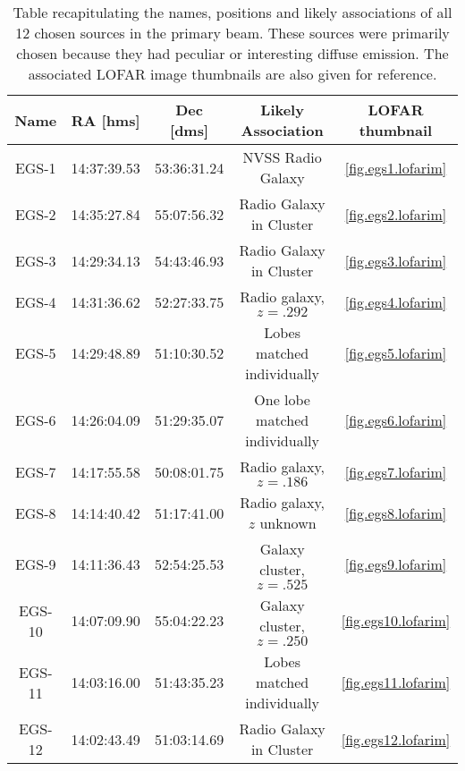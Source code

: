 \begin{table}[h!]
\begin{tabular}{ccccc}
Name    & RA [hms]    & Dec [dms]   & Likely Association            & LOFAR thumbnail \\\hline
EGS-1   & 14:37:39.53 & 53:36:31.24 & NVSS Radio Galaxy             & \cref{fig.egs1.lofarim} \\
EGS-2   & 14:35:27.84 & 55:07:56.32 & Radio Galaxy in Cluster       & \cref{fig.egs2.lofarim} \\ 
EGS-3   & 14:29:34.13 & 54:43:46.93 & Radio Galaxy in Cluster       & \cref{fig.egs3.lofarim} \\
EGS-4   & 14:31:36.62 & 52:27:33.75 & Radio galaxy, $z=.292$        & \cref{fig.egs4.lofarim} \\
EGS-5   & 14:29:48.89 & 51:10:30.52 & Lobes matched individually    & \cref{fig.egs5.lofarim} \\
EGS-6   & 14:26:04.09 & 51:29:35.07 & One lobe matched individually & \cref{fig.egs6.lofarim} \\
EGS-7   & 14:17:55.58 & 50:08:01.75 & Radio galaxy, $z=.186$        & \cref{fig.egs7.lofarim} \\
EGS-8   & 14:14:40.42 & 51:17:41.00 & Radio galaxy, $z$ unknown     & \cref{fig.egs8.lofarim} \\
EGS-9   & 14:11:36.43 & 52:54:25.53 & Galaxy cluster, $z=.525$      & \cref{fig.egs9.lofarim} \\
EGS-10  & 14:07:09.90 & 55:04:22.23 & Galaxy cluster, $z=.250$      & \cref{fig.egs10.lofarim} \\
EGS-11  & 14:03:16.00 & 51:43:35.23 & Lobes matched individually    & \cref{fig.egs11.lofarim} \\
EGS-12  & 14:02:43.49 & 51:03:14.69 & Radio Galaxy in Cluster       & \cref{fig.egs12.lofarim} \\
\end{tabular}
\caption{\label{table.egs.sources} Table recapitulating the names, positions and likely associations of all 12 chosen sources in the primary beam. These sources were primarily chosen because they had peculiar or interesting diffuse emission. The associated LOFAR image thumbnails are also given for reference.}
\end{table}

